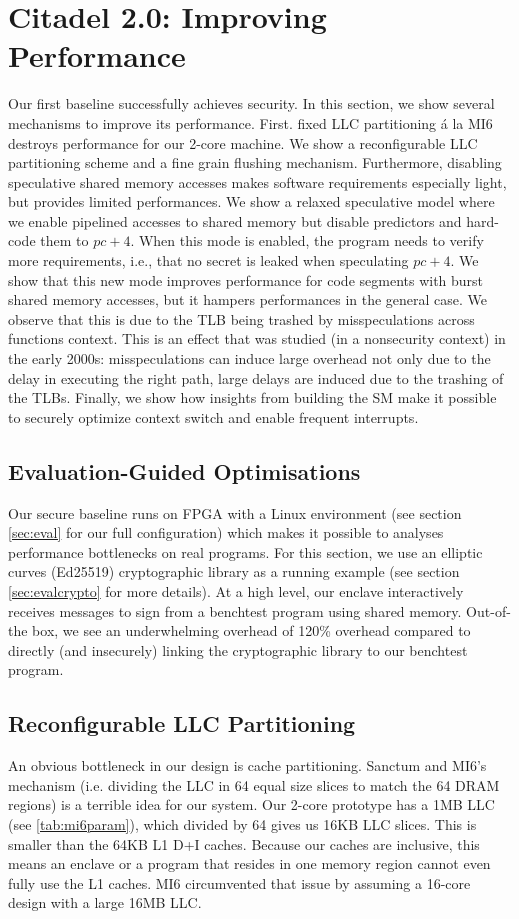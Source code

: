 \section{Citadel 2.0: Improving Performance}

Our first baseline successfully achieves security.
In this section, we show several mechanisms to improve its performance.
First. fixed LLC partitioning \'{a} la MI6 destroys performance for our 2-core machine.
We show a reconfigurable LLC partitioning scheme and a fine grain flushing mechanism.
Furthermore, disabling speculative shared memory accesses makes software requirements especially light, but provides limited performances.
We show a relaxed speculative model where we enable pipelined accesses to shared memory but disable predictors and hard-code them to $pc+4$.
When this mode is enabled, the program needs to verify more requirements, i.e., that no secret is leaked when speculating $pc+4$.
We show that this new mode improves performance for code segments with burst shared memory accesses, but it hampers performances in the general case.
We observe that this is due to the TLB being trashed by misspeculations across functions context. 
This is an effect that was studied (in a nonsecurity context) in the early 2000s\cite{onur1,onur2,onur3}: misspeculations can induce large overhead not only due to the delay in executing the right path, large delays are induced due to the trashing of the TLBs.
Finally, we show how insights from building the SM make it possible to securely optimize context switch and enable frequent interrupts.

\subsection{Evaluation-Guided Optimisations}

Our secure baseline runs on FPGA with a Linux environment (see section \ref{sec:eval} for our full configuration) which makes it possible to analyses performance bottlenecks on real programs.
For this section, we use an elliptic curves (Ed25519) cryptographic library as a running example (see section \ref{sec:evalcrypto} for more details).
At a high level, our enclave interactively receives messages to sign from a benchtest program using shared memory.
Out-of-the box, we see an underwhelming overhead of 120\% overhead compared to directly (and insecurely) linking the cryptographic library to our benchtest program.

\subsection{Reconfigurable LLC Partitioning}
\label{sec:dynamiccache}
An obvious bottleneck in our design is cache partitioning.
Sanctum and MI6's mechanism (i.e. dividing the LLC in 64 equal size slices to match the 64 DRAM regions) is a terrible idea for our system.
Our 2-core prototype has a 1MB LLC (see \ref{tab:mi6param}), which divided by 64 gives us 16KB LLC slices.
This is smaller than the 64KB L1 D+I caches.
Because our caches are inclusive, this means an enclave or a program that resides in one memory region cannot even fully use the L1 caches.
MI6 circumvented that issue by assuming a 16-core design with a large 16MB LLC.

